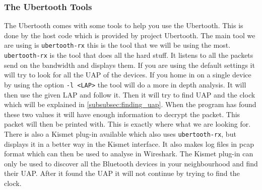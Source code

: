 \subsubsection{The Ubertooth Tools}
\label{subsubsec:ubertooth_tools}
The Ubertooth comes with some tools to help you use the Ubertooth. This is done by the host code which is provided by project Ubertooth. 
The main tool we are using is \verb|ubertooth-rx|  this is the tool that we will be using the most. \verb|ubertooth-rx| is the tool that does all the hard stuff. It listens to all the packets send on the bandwidth and displays them. If you are using the default settings it will try to look for all the UAP of the devices. If you home in on a single device by using the option \verb|-l <LAP>| the tool will do a more in depth analysis. It will then use the given LAP and follow it. Then it will try to find UAP and the clock which will be explained in \ref{subsubsec:finding_uap}. When the program has found these two values it will have enough information to decrypt the packet. This packet will then be printed with. This is exactly where what we are looking for. \pend There is also a Kismet plug-in available which also uses \verb|ubertooth-rx|, but displays it in a better way in the Kismet interface. It also makes log files in pcap format which can then be used to analyse in Wireshark. The Kismet plug-in can only be used to discover all the Bluetooth devices in your neighbourhood and find their UAP. After it found the UAP it will not continue by trying to find the clock.

